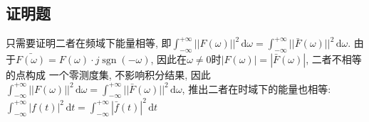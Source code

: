 \subsection{证明题}

只需要证明二者在频域下能量相等, 即$\displaystyle\int_{-\infty}^{+\infty}
||F(\omega)||^2\,\mathrm{d}\omega=\int_{-\infty}^{+\infty}||\bar{F}(\omega)||^2
\,\mathrm{d}\omega$. 由于$\bar{F(\omega)}=F(\omega)\cdot j\operatorname{sgn}(
-\omega)$, 因此在$\omega\ne0$时$|F(\omega)|=|\bar{F}(\omega)|$, 二者不相等的点构成
一个零测度集, 不影响积分结果, 因此$\displaystyle\int_{-\infty}^{+\infty}
||F(\omega)||^2\,\mathrm{d}\omega=\int_{-\infty}^{+\infty}||\bar{F}(\omega)||^2
\,\mathrm{d}\omega$, 推出二者在时域下的能量也相等: $\displaystyle
\int_{-\infty}^{+\infty}|f(t)|^2\,\mathrm{d}t=\int_{-\infty}^{+\infty}
|\bar{f}(t)|^2\,\mathrm{d}t$


        